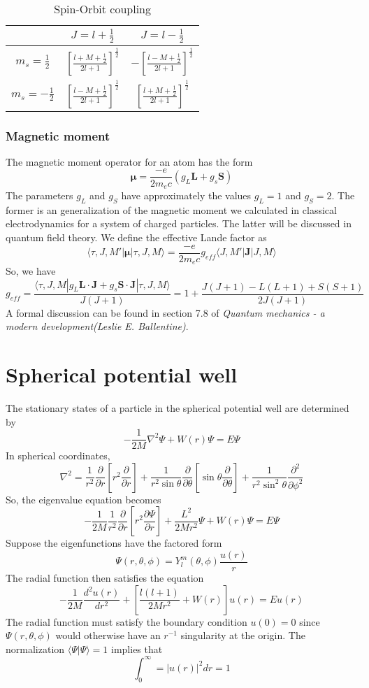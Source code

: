 \documentclass[cyan]{elegantnote}
\begin{document}
\begin{table}[!th]
\begin{tabular}{|c|c|c|}
\hline
 & $J=l+\frac{1}{2}$ & $J=l-\frac{1}{2}$ \\
 \hline
 $m_s = \frac{1}{2}$ & $\left[ \frac{l+M+\frac{1}{2}}{2l+1}\right ]^{\frac{1}{2}} $ & $-\left[ \frac{l-M+\frac{1}{2}}{2l+1}\right ]^{\frac{1}{2}} $ \\
 \hline
 $m_s = -\frac{1}{2}$ & $\left[ \frac{l-M+\frac{1}{2}}{2l+1}\right ]^{\frac{1}{2}} $ & $\left[ \frac{l+M+\frac{1}{2}}{2l+1}\right ]^{\frac{1}{2}} $ \\
\hline
\end{tabular}
\caption{Spin-Orbit coupling}
\end{table}
\subsubsection{Magnetic moment}
The magnetic moment operator for an atom has the form
\[\bm{\mu} = \frac{-e}{2m_e c} (g_L\bm{L} + g_s \bm{S})\]
The parameters $g_L$ and $g_S$ have approximately the
values $g_L = 1$ and $g_S = 2$. The former is an generalization of the magnetic moment we calculated in classical electrodynamics for a system of charged particles. The latter will be discussed in quantum field theory. We define the effective Lande factor as
\[\langle \tau,J,M' | \bm{\mu} | \tau,J,M \rangle = \frac{-e}{2m_e c} g_{eff} \langle J,M' | \bm{J} | J,M \rangle\]
So, we have
\[g_{eff} = \frac{\langle \tau,J,M | g_L\bm{L}\cdot\bm{J} + g_s \bm{S}\cdot\bm{J} | \tau,J,M \rangle}{J(J+1)} = 1 + \frac{J(J+1)- L(L+1) + S(S+1)}{2J(J+1)}\]
A formal discussion can be found in section 7.8 of \emph{Quantum mechanics - a modern development(Leslie E. Ballentine)}.

\section{Spherical potential well}
The stationary states of a particle in the spherical potential well are determined by
\[-\frac{1}{2M}\nabla^2 \Psi  + W(r) \Psi = E\Psi \]
In spherical coordinates, 
\[\nabla^2 = \frac{1}{r^2} \frac{\partial}{\partial r} \left [ r^2\frac{\partial}{\partial r} \right ] + \frac{1}{r^2\sin\theta} \frac{\partial}{\partial \theta} \left [\sin\theta \frac{\partial}{\partial \theta} \right ] + \frac{1}{r^2\sin^2\theta} \frac{\partial^2}{\partial\phi^2}\]
So, the eigenvalue equation becomes
\[-\frac{1}{2M} \frac{1}{r^2} \frac{\partial}{\partial r} \left [ r^2\frac{\partial \Psi}{\partial r}\right ]  + \frac{L^2}{2Mr^2} \Psi + W(r)\Psi = E\Psi\]
Suppose the eigenfunctions have the factored form
\[\Psi(r,\theta,\phi) = Y_l^m(\theta,\phi) \frac{u(r)}{r}\]
The radial function then satisfies the equation
\[-\frac{1}{2M} \frac{d^2 u(r)}{dr^2} + \left[ \frac{l(l+1)}{2Mr^2} + W(r)\right]u(r) = Eu(r)\]
The radial function must satisfy the boundary condition $u(0) = 0$ since $\Psi(r,\theta,\phi)$ would otherwise have an $r^{-1}$ singularity at the origin. The normalization $\langle \Psi | \Psi \rangle = 1$ implies that
\[\int_0^{\infty} = |u(r)|^2 dr = 1\]
\end{document}
